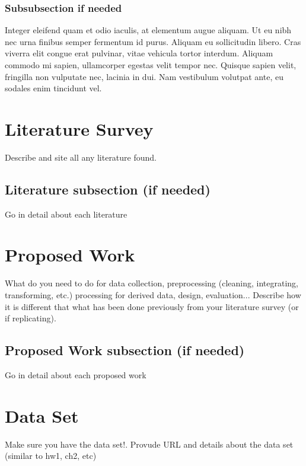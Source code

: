 \documentclass[11pt,sigconf]{acmart}
\begin{document}
\subsubsection{Subsubsection if needed}

Integer eleifend quam et odio iaculis, at elementum augue aliquam.
Ut eu nibh nec urna finibus semper fermentum id purus.
Aliquam eu sollicitudin libero.
Cras viverra elit congue erat pulvinar, vitae vehicula tortor interdum.
Aliquam commodo mi sapien, ullamcorper egestas velit tempor nec.
Quisque sapien velit, fringilla non vulputate nec, lacinia in dui.
Nam vestibulum volutpat ante, eu sodales enim tincidunt vel.



\section{Literature Survey}

Describe and site all any literature found.

\subsection{Literature subsection (if needed)}

Go in detail about each literature



\section{Proposed Work}

What do you need to do for data collection, preprocessing (cleaning, integrating, transforming, etc.) processing for derived data, design, evaluation...
Describe how it is different that what has been done previously from your literature survey (or if replicating).

\subsection{Proposed Work subsection (if needed)}

Go in detail about each proposed work



\section{Data Set}

Make sure you have the data set!. Provude URL and details about the data set (similar to hw1, ch2, etc)
\end{document}

